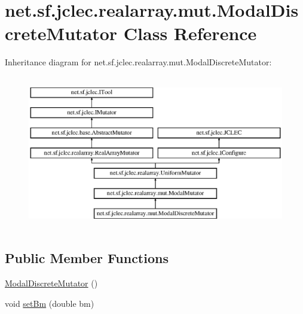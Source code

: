 \hypertarget{classnet_1_1sf_1_1jclec_1_1realarray_1_1mut_1_1_modal_discrete_mutator}{\section{net.\-sf.\-jclec.\-realarray.\-mut.\-Modal\-Discrete\-Mutator Class Reference}
\label{classnet_1_1sf_1_1jclec_1_1realarray_1_1mut_1_1_modal_discrete_mutator}
}
Inheritance diagram for net.\-sf.\-jclec.\-realarray.\-mut.\-Modal\-Discrete\-Mutator\-:\begin{figure}[H]
\begin{center}
\leavevmode
\includegraphics[height=6.735395cm]{classnet_1_1sf_1_1jclec_1_1realarray_1_1mut_1_1_modal_discrete_mutator}
\end{center}
\end{figure}
\subsection*{Public Member Functions}
\begin{DoxyCompactItemize}
\item 
\hyperlink{classnet_1_1sf_1_1jclec_1_1realarray_1_1mut_1_1_modal_discrete_mutator_ae2466221dedf6ba8dce064db5138c44e}{Modal\-Discrete\-Mutator} ()
\item 
void \hyperlink{classnet_1_1sf_1_1jclec_1_1realarray_1_1mut_1_1_modal_discrete_mutator_ae63652d53f08ac54e9b397ab012071a3}{set\-Bm} (double bm)
\end{DoxyCompactItemize}
